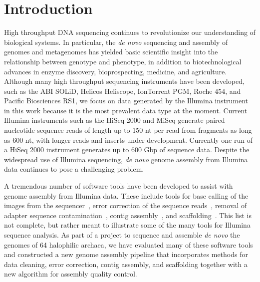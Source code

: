 \documentclass[10pt]{article}
\begin{document}

\section*{Introduction}
High throughput DNA sequencing continues to revolutionize our understanding of biological systems. In particular,
the \textit{de novo} sequencing and assembly of genomes and metagenomes has yielded basic scientific insight into 
the relationship between genotype and phenotype,
in addition to biotechnological advances in enzyme discovery, bioprospecting, medicine, and agriculture.  
Although many high throughput sequencing instruments have been developed, such as the ABI SOLiD, Helicos Heliscope, IonTorrent PGM, Roche 454, and 
Pacific Biosciences RS1, we focus on data generated by the Illumina instrument in this work because it is the most prevalent data type at the moment. 
Current Illumina instruments such as the HiSeq 2000 and MiSeq generate paired nucleotide sequence reads of length up to 150 nt per read from fragments  
as long as 600 nt, with longer reads and inserts under development. Currently one run of a HiSeq 2000 instrument generates up to 600 Gbp of sequence data.  Despite the widespread use of Illumina  
sequencing, \emph{de novo} genome assembly from Illumina data continues to pose a challenging problem.

A tremendous number of software tools have been developed to assist with genome assembly from Illumina data.
These include tools for base calling of the images from the sequencer~\cite{BayesCall,Kircher2009},
error correction of the sequence reads~\cite{Kelley2010,Kao2011}, removal of adapter sequence contamination~\cite{Lassmann2009},
contig assembly~\cite{Warren2007,Chaisson2008}, and scaffolding~\cite{Koren2011,Boetzer2011,Dayarian2010}.
This list is not complete, but rather meant to illustrate some of the many tools for Illumina sequence analysis.
As part of a project to sequence and assemble \textit{de novo} the genomes of 64 halophilic archaea, we have
evaluated many of these software tools and constructed a new genome assembly pipeline that incorporates
methods for data cleaning, error correction, contig assembly, and scaffolding together with a new algorithm
for assembly quality control. 
\end{document}
